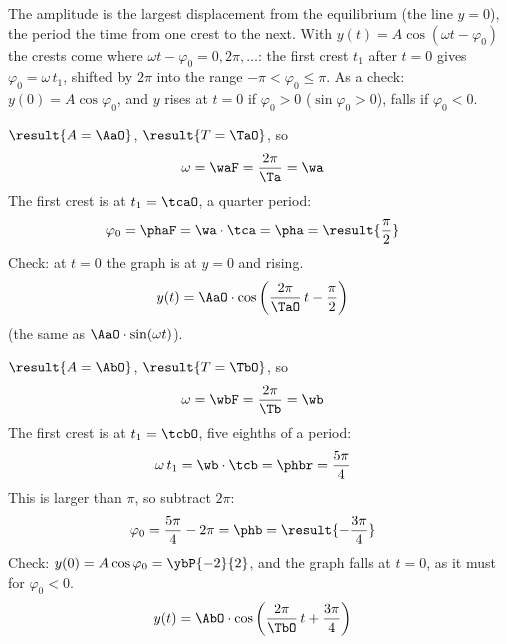 The amplitude is the largest displacement from the equilibrium (the line $y = 0$), the period the time from one crest to the next. With $y(t) = A\cos(\omega t - \varphi_0)$ the crests come where $\omega t - \varphi_0 = 0, 2\pi, \dots$: the first crest $t_1$ after $t = 0$ gives $\varphi_0 = \omega\,t_1$, shifted by $2\pi$ into the range $-\pi < \varphi_0 \le \pi$. As a check: $y(0) = A\cos\varphi_0$, and $y$ rises at $t = 0$ if $\varphi_0 > 0$ ($\sin\varphi_0>0$), falls if $\varphi_0 < 0$.

\begin{abcliste}
\abc
$\result{A = \AaO}$, $\result{T = \TaO}$, so
\begin{align}
 \omega &= \waF = \frac{2\pi}{\Ta} = \wa
\end{align}
The first crest is at $t_1 = \tcaO$, a quarter period:
\begin{align}
 \varphi_0 &= \phaF = \wa\cdot\tca = \pha = \result{\frac{\pi}{2}}
\end{align}
Check: at $t = 0$ the graph is at $y = 0$ and rising.
\begin{align}
 y(t) &= \AaO\cdot\cos\left(\frac{2\pi}{\TaO}\,t - \frac{\pi}{2}\right)
\end{align}
(the same as $\AaO\cdot\sin(\omega t)$).

\abc
$\result{A = \AbO}$, $\result{T = \TbO}$, so
\begin{align}
 \omega &= \wbF = \frac{2\pi}{\Tb} = \wb
\end{align}
The first crest is at $t_1 = \tcbO$, five eighths of a period:
\begin{align}
 \omega\,t_1 &= \wb\cdot\tcb = \phbr = \frac{5\pi}{4}
\end{align}
This is larger than $\pi$, so subtract $2\pi$:
\begin{align}
 \varphi_0 &= \frac{5\pi}{4}-2\pi = \phb = \result{-\frac{3\pi}{4}}
\end{align}
Check: $y(0) = A\cos\varphi_0 = \ybP{-2}{2}$, and the graph falls at $t = 0$, as it must for $\varphi_0 < 0$.
\begin{align}
 y(t) &= \AbO\cdot\cos\left(\frac{2\pi}{\TbO}\,t + \frac{3\pi}{4}\right)
\end{align}
\end{abcliste}
